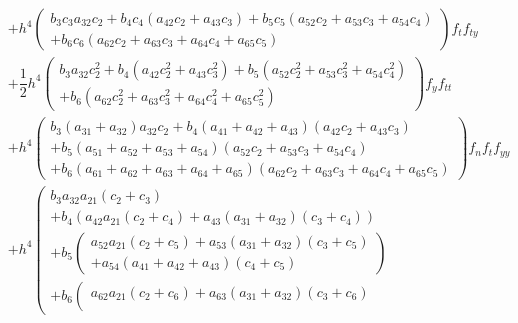 \documentclass[a4paper,oneside]{book}
\numberwithin{equation}{chapter}
\begin{document}
\begin{align}
& + {h^4}\left( \begin{array}{l}
{b_3}{c_3}{a_{32}}{c_2} + {b_4}{c_4}\left( {{a_{42}}{c_2} + {a_{43}}{c_3}} \right) + {b_5}{c_5}\left( {{a_{52}}{c_2} + {a_{53}}{c_3} + {a_{54}}{c_4}} \right)\\
 + {b_6}{c_6}\left( {{a_{62}}{c_2} + {a_{63}}{c_3} + {a_{64}}{c_4} + {a_{65}}{c_5}} \right)
\end{array} \right){f_t}{f_{ty}}\\
 &+ \dfrac{1}{2}{h^4}\left( \begin{array}{l}
{b_3}{a_{32}}c_2^2 + {b_4}\left( {{a_{42}}c_2^2 + {a_{43}}c_3^2} \right) + {b_5}\left( {{a_{52}}c_2^2 + {a_{53}}c_3^2 + {a_{54}}c_4^2} \right)\\
 + {b_6}\left( {{a_{62}}c_2^2 + {a_{63}}c_3^2 + {a_{64}}c_4^2 + {a_{65}}c_5^2} \right)
\end{array} \right){f_y}{f_{tt}}\\
 &+ {h^4}\left( \begin{array}{l}
{b_3}\left( {{a_{31}} + {a_{32}}} \right){a_{32}}{c_2} + {b_4}\left( {{a_{41}} + {a_{42}} + {a_{43}}} \right)\left( {{a_{42}}{c_2} + {a_{43}}{c_3}} \right)\\
 + {b_5}\left( {{a_{51}} + {a_{52}} + {a_{53}} + {a_{54}}} \right)\left( {{a_{52}}{c_2} + {a_{53}}{c_3} + {a_{54}}{c_4}} \right)\\
 + {b_6}\left( {{a_{61}} + {a_{62}} + {a_{63}} + {a_{64}} + {a_{65}}} \right)\left( {{a_{62}}{c_2} + {a_{63}}{c_3} + {a_{64}}{c_4} + {a_{65}}{c_5}} \right)
\end{array} \right){f_n}{f_t}{f_{yy}}\\
& + {h^4}\left( \begin{array}{l}
{b_3}{a_{32}}{a_{21}}\left( {{c_2} + {c_3}} \right)\\
 + {b_4}\left( {{a_{42}}{a_{21}}\left( {{c_2} + {c_4}} \right) + {a_{43}}\left( {{a_{31}} + {a_{32}}} \right)\left( {{c_3} + {c_4}} \right)} \right)\\
 + {b_5}\left( \begin{array}{l}
{a_{52}}{a_{21}}\left( {{c_2} + {c_5}} \right) + {a_{53}}\left( {{a_{31}} + {a_{32}}} \right)\left( {{c_3} + {c_5}} \right)\\
 + {a_{54}}\left( {{a_{41}} + {a_{42}} + {a_{43}}} \right)\left( {{c_4} + {c_5}} \right)
\end{array} \right)\\
 + {b_6}\left( \begin{array}{l}
{a_{62}}{a_{21}}\left( {{c_2} + {c_6}} \right) + {a_{63}}\left( {{a_{31}} + {a_{32}}} \right)\left( {{c_3} + {c_6}} \right)\\

\end{array}
\end{array}
\end{align}
\end{document}
